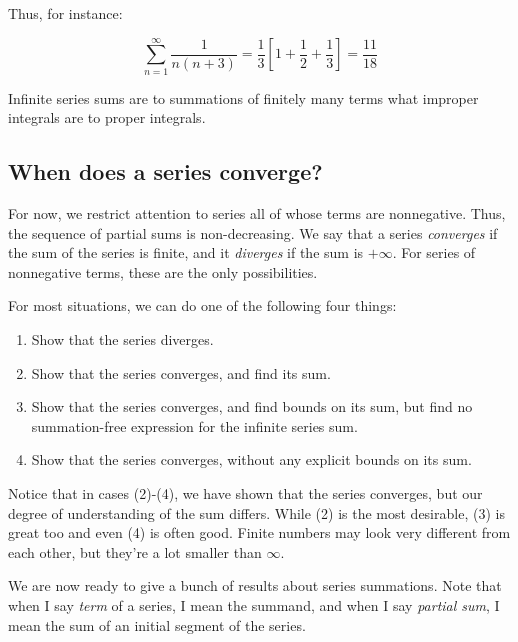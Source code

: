 \documentclass{amsart}
\begin{document}
Thus, for instance:

$$\sum_{n=1}^\infty \frac{1}{n(n+3)} = \frac{1}{3}\left[1 + \frac{1}{2} + \frac{1}{3}\right] = \frac{11}{18}$$

Infinite series sums are to summations of finitely many terms what
improper integrals are to proper integrals.

\subsection{When does a series converge?}

For now, we restrict attention to series all of whose terms are
nonnegative.  Thus, the sequence of partial sums is non-decreasing. We
say that a series {\em converges} if the sum of the series is finite,
and it {\em diverges} if the sum is $+\infty$. For series of
nonnegative terms, these are the only possibilities.

For most situations, we can do one of the following four things:

\begin{enumerate}
\item Show that the series diverges.
\item Show that the series converges, and find its sum.
\item Show that the series converges, and find bounds on its sum, but
  find no summation-free expression for the infinite series sum.
\item Show that the series converges, without any explicit bounds on
  its sum.
\end{enumerate}

Notice that in cases (2)-(4), we have shown that the series converges,
but our degree of understanding of the sum differs. While (2) is the
most desirable, (3) is great too and even (4) is often good. Finite
numbers may look very different from each other, but they're a lot
smaller than $\infty$.

We are now ready to give a bunch of results about series
summations. Note that when I say {\em term} of a series, I mean the
summand, and when I say {\em partial sum}, I mean the sum of an
initial segment of the series.
\end{document}
